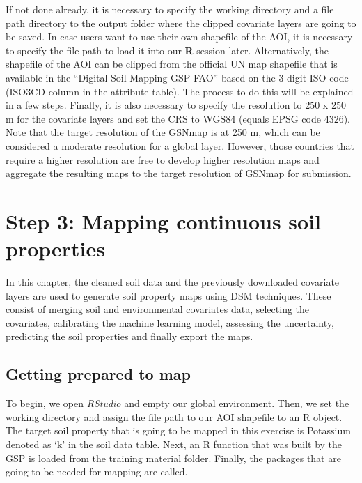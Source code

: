 \documentclass[
  10pt,
  b5paper,
  oneside]{book}
\begin{document}
If not done already, it is necessary to specify the working directory and a file path directory to the output folder where the clipped covariate layers are going to be saved. In case users want to use their own shapefile of the AOI, it is necessary to specify the file path to load it into our \textbf{R} session later. Alternatively, the shapefile of the AOI can be clipped from the official UN map shapefile that is available in the ``Digital-Soil-Mapping-GSP-FAO'' based on the 3-digit ISO code (ISO3CD column in the attribute table). The process to do this will be explained in a few steps. Finally, it is also necessary to specify the resolution to 250 x 250 m for the covariate layers and set the CRS to WGS84 (equals EPSG code 4326). Note that the target resolution of the GSNmap is at 250 m, which can be considered a moderate resolution for a global layer. However, those countries that require a higher resolution are free to develop higher resolution maps and aggregate the resulting maps to the target resolution of GSNmap for submission.

\hypertarget{step-3-mapping-continuous-soil-properties}{%
\chapter{Step 3: Mapping continuous soil properties}\label{step-3-mapping-continuous-soil-properties}}

In this chapter, the cleaned soil data and the previously downloaded covariate layers are used to generate soil property maps using DSM techniques. These consist of merging soil and environmental covariates data, selecting the covariates, calibrating the machine learning model, assessing the uncertainty, predicting the soil properties and finally export the maps.

\hypertarget{getting-prepared-to-map}{%
\section{Getting prepared to map}\label{getting-prepared-to-map}}

To begin, we open \emph{RStudio} and empty our global environment. Then, we set the working directory and assign the file path to our AOI shapefile to an R object. The target soil property that is going to be mapped in this exercise is Potassium denoted as `k' in the soil data table. Next, an R function that was built by the GSP is loaded from the training material folder. Finally, the packages that are going to be needed for mapping are called.
\end{document}
